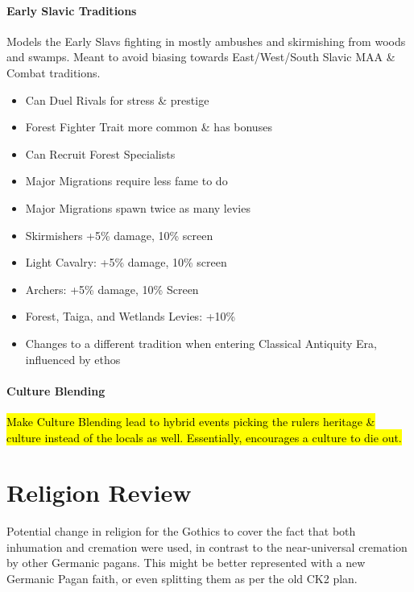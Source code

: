 \documentclass{article}
\begin{document}
	\paragraph{Early Slavic Traditions}
	Models the Early Slavs fighting in mostly ambushes and skirmishing from woods and swamps. Meant to avoid biasing towards East/West/South Slavic MAA \& Combat traditions.
	
	\begin{itemize}
		\item Can Duel Rivals for stress \& prestige
		\item Forest Fighter Trait more common \& has bonuses
		\item Can Recruit Forest Specialists
		\item Major Migrations require less fame to do
		\item Major Migrations spawn twice as many levies
		\item Skirmishers +5\% damage, 10\% screen
		\item Light Cavalry: +5\% damage, 10\% screen
		\item Archers: +5\% damage, 10\% Screen
		\item Forest, Taiga, and Wetlands Levies: +10\%
		\item Changes to a different tradition when entering Classical Antiquity Era, influenced by ethos
	\end{itemize}
	
	\paragraph{Culture Blending}
	\hl{Make Culture Blending lead to hybrid events picking the rulers heritage \& culture instead of the locals as well. Essentially, encourages a culture to die out.}
	
	\section{Religion Review}
	\label{sec:religion_review}
	Potential change in religion for the Gothics to cover the fact that both inhumation and cremation were used, in contrast to the near-universal cremation by other Germanic pagans.
	This might be better represented with a new Germanic Pagan faith, or even splitting them as per the old CK2 plan.
	
	\begin{comment}
		\subsection{Turks}
		\label{sec:religion_review:subsec:turks}
		Bolghars? Monotheistic/Henotheistic Tengrism? How would it be different than Mongolic Tengrism?
	\end{comment}
	
\end{document}
